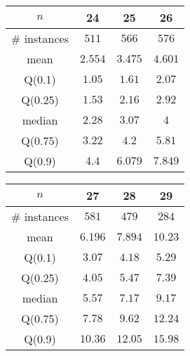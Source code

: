 \begin{tabular}{c|ccc} 
\hline 
$n$ & 24 & 25 & 26 \tabularnewline 
\hline 
\hline 
\# instances & $511$ & $566$ & $576$ \tabularnewline 
mean & $2.554$ & $3.475$ & $4.601$ \tabularnewline 
Q(0.1) & $1.05$ & $1.61$ & $2.07$ \tabularnewline 
Q(0.25) & $1.53$ & $2.16$ & $2.92$ \tabularnewline 
median & $2.28$ & $3.07$ & $4$ \tabularnewline 
Q(0.75) & $3.22$ & $4.2$ & $5.81$ \tabularnewline 
Q(0.9) & $4.4$ & $6.079$ & $7.849$ \tabularnewline 
\hline 
\end{tabular} 
\medskip{} 

\begin{tabular}{c|ccc} 
\hline 
$n$ & 27 & 28 & 29 \tabularnewline 
\hline 
\hline 
\# instances & $581$ & $479$ & $284$ \tabularnewline 
mean & $6.196$ & $7.894$ & $10.23$ \tabularnewline 
Q(0.1) & $3.07$ & $4.18$ & $5.29$ \tabularnewline 
Q(0.25) & $4.05$ & $5.47$ & $7.39$ \tabularnewline 
median & $5.57$ & $7.17$ & $9.17$ \tabularnewline 
Q(0.75) & $7.78$ & $9.62$ & $12.24$ \tabularnewline 
Q(0.9) & $10.36$ & $12.05$ & $15.98$ \tabularnewline 
\hline 
\end{tabular} 
\medskip{} 

